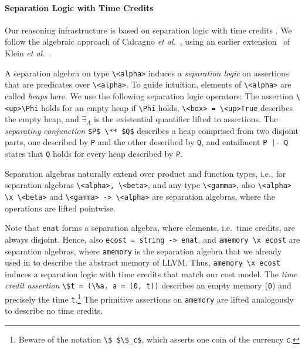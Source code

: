 \documentclass[acmsmall]{acmart}
\newcommand{\is}{\lstinline[language=isabelle]}
\begin{document}
\paragraph{Separation Logic with Time Credits}
Our reasoning infrastructure is based on separation logic with time credits \cite{Atkey10,ChargueraudP19,gueneau-chargueraud-jourdan-pottier-19}. 
We follow the algebraic approach of Calcagno \emph{et al.}~\cite{calcagno2007local}, using an earlier extension~\cite{lammich2019LLVM} of Klein \emph{et al.}~\cite{afp-sep}.

A separation algebra on type \is{\<alpha>} induces a \emph{separation logic} on assertions that are predicates over \is{\<alpha>}.
To guide intuition, elements of \is{\<alpha>} are called \emph{heaps} here.
We use the following separation logic operators:
%
The assertion \is{\<up>\Phi} holds for an empty heap if \is{\Phi} holds, \is{\<box> = \<up>True} describes the empty heap,
and $\exists_A$ is the existential quantifier lifted to assertions.
The \emph{separating conjunction} \is{$P$ \** $Q$} describes a heap comprised from two disjoint parts, 
one described by \is$P$ and the other described by \is$Q$, and entailment \is{P |- Q} states that \is$Q$ holds for every heap described by \is$P$.

Separation algebras naturally extend over product and function types, i.e.,
for separation algebras \is$\<alpha>, \<beta>$, and any type \is$\<gamma>$,
also \is$\<alpha> \x \<beta>$ and \is$\<gamma> -> \<alpha>$ are separation algebras, where the operations are lifted pointwise.

Note that \is{enat} forms a separation algebra, where elements, i.e.\ time credits, are always disjoint.
Hence, also \is{ecost = string -> enat}, and \is{amemory \x ecost} are separation algebras, 
where \is{amemory} is the separation algebra that we already used in \cite{lammich2019LLVM} 
to describe the abstract memory of LLVM. 
Thus, \is{amemory \x ecost} induces a separation logic with time credits that match our cost model. The \emph{time credit assertion} \is{\$t = (\%a. a = (0, t))} describes an empty memory (\is$0$) and precisely the time \is$t$.\cprotect\footnote{Beware of the notation \is{\$ $\$_c$}, which asserts one coin of the currency \is{c}.}
The primitive assertions on \is{amemory} are lifted analogously to describe no time credits.
\end{document}
